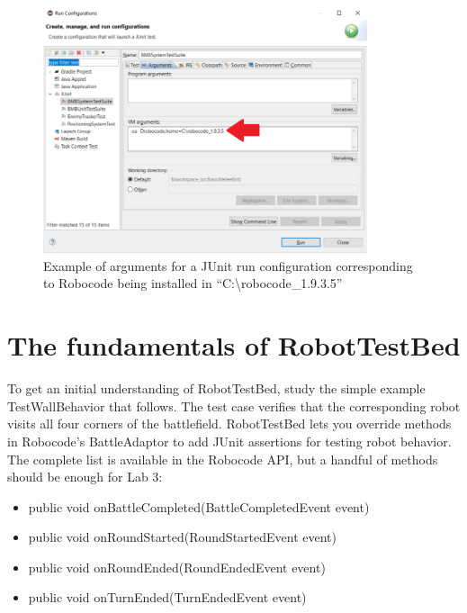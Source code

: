 \documentclass{scrreprt}
\begin{document}
\begin{figure}
\centering
\includegraphics[width=0.85\textwidth]{figures/runConfig.png}
\caption{Example of arguments for a JUnit run configuration corresponding to Robocode being installed in ``C:\textbackslash robocode\_1.9.3.5''}
\label{fig:runConfig}
\end{figure}

\vspace{1em}
\vspace{1em}


\newpage

\section{The fundamentals of RobotTestBed}
To get an initial understanding of RobotTestBed, study the simple example TestWallBehavior that follows. The test case verifies that the corresponding robot visits all four corners of the battlefield. RobotTestBed lets you override methods in Robocode's BattleAdaptor to add JUnit assertions for testing robot behavior. The complete list is available in the Robocode API, but a handful of methods should be enough for Lab 3:
\begin{itemize}
\item public void onBattleCompleted(BattleCompletedEvent event)
\item public void onRoundStarted(RoundStartedEvent event)
\item public void onRoundEnded(RoundEndedEvent event)
\item public void onTurnEnded(TurnEndedEvent event)
\end{itemize}
\end{document}
